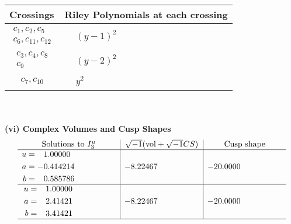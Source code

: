 \documentclass[1p]{elsarticle_modified}
\theoremstyle{definition}
\newcommand{\I}{\sqrt{-1}}
\begin{document}
\begin{tabular}{m{50pt}|m{274pt}}
Crossings & \hspace{64pt}Riley Polynomials at each crossing \\
\hline $$\begin{aligned}c_{1},c_{2},c_{5}\\c_{6},c_{11},c_{12}\end{aligned}$$&$\begin{aligned}
&(y-1)^2
\end{aligned}$\\
\hline $$\begin{aligned}c_{3},c_{4},c_{8}\\c_{9}\end{aligned}$$&$\begin{aligned}
&(y-2)^2
\end{aligned}$\\
\hline $$\begin{aligned}c_{7},c_{10}\end{aligned}$$&$\begin{aligned}
&y^2
\end{aligned}$\\
\hline
\end{tabular}\\~\\
\newpage\flushleft \textbf{(vi) Complex Volumes and Cusp Shapes}
$$\begin{array}{c|c|c}  
\text{Solutions to }I^u_{3}& \I (\text{vol} + \sqrt{-1}CS) & \text{Cusp shape}\\
 \hline 
\begin{aligned}
u &= \phantom{-}1.00000\phantom{ +0.000000I} \\
a &= -0.414214\phantom{ +0.000000I} \\
b &= \phantom{-}0.585786\phantom{ +0.000000I}\end{aligned}
 & -8.22467\phantom{ +0.000000I} & -20.0000\phantom{ +0.000000I} \\ \hline\begin{aligned}
u &= \phantom{-}1.00000\phantom{ +0.000000I} \\
a &= \phantom{-}2.41421\phantom{ +0.000000I} \\
b &= \phantom{-}3.41421\phantom{ +0.000000I}\end{aligned}
 & -8.22467\phantom{ +0.000000I} & -20.0000\phantom{ +0.000000I}\\
 \hline 
 \end{array}$$\newpage\newpage\renewcommand{\arraystretch}{1}
\end{document}
